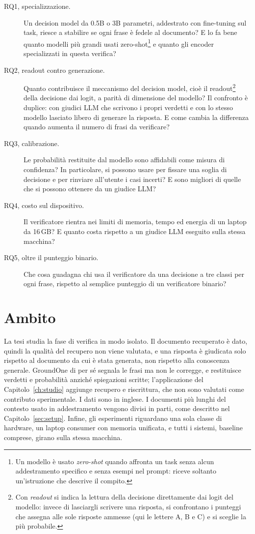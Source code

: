 \begin{description}
\item[RQ1, specializzazione.] Un decision model da 0.5B o 3B parametri, addestrato con fine-tuning sul task, riesce a
stabilire se ogni frase è fedele al documento? E lo fa bene quanto modelli più grandi usati zero-shot\footnote{Un modello è usato \emph{zero-shot} quando affronta un task senza alcun addestramento specifico
e senza esempi nel prompt: riceve soltanto un'istruzione che descrive il compito.}
e quanto gli encoder specializzati in questa verifica?
\item[RQ2, readout contro generazione.] Quanto contribuisce il meccanismo del decision model, cioè il readout\footnote{Con \emph{readout} si indica la lettura della decisione direttamente dai logit del modello:
invece di lasciargli scrivere una risposta, si confrontano i punteggi che assegna alle sole risposte ammesse (qui le
lettere A, B e C) e si sceglie la più probabile.}
della decisione dai logit, a parità di dimensione del modello? Il confronto è duplice: con giudici LLM che
scrivono i propri verdetti e con lo stesso modello lasciato libero di generare la risposta. E come cambia la differenza
quando aumenta il numero di frasi da verificare?
\item[RQ3, calibrazione.] Le probabilità restituite dal modello sono affidabili come misura di confidenza? In
particolare, si possono usare per fissare una soglia di decisione e per rinviare all'utente i casi incerti? E sono
migliori di quelle che si possono ottenere da un giudice LLM?
\item[RQ4, costo sul dispositivo.] Il verificatore rientra nei limiti di memoria, tempo ed energia di un laptop da
16\,GB? E quanto costa rispetto a un giudice LLM eseguito sulla stessa macchina?
\item[RQ5, oltre il punteggio binario.] Che cosa guadagna chi usa il verificatore da una decisione a tre classi per
ogni frase, rispetto al semplice punteggio di un verificatore binario?
\end{description}

\section{Ambito}
\label{sec:intro-scope}

La tesi studia la fase di verifica in modo isolato. Il documento recuperato è dato, quindi la qualità del recupero non
viene valutata, e una risposta è giudicata solo rispetto al documento da cui è stata generata, non rispetto alla
conoscenza generale. GroundOne di per sé segnala le frasi ma non le corregge, e restituisce verdetti e probabilità anziché spiegazioni scritte; l'applicazione del Capitolo~\ref{ch:studio} aggiunge recupero e riscrittura, che non sono valutati come contributo sperimentale. I dati sono in inglese. I documenti più lunghi del contesto usato in addestramento vengono divisi in
parti, come descritto nel Capitolo~\ref{sec:setup}. Infine, gli esperimenti riguardano una sola classe di hardware, un
laptop consumer con memoria unificata, e tutti i sistemi, baseline comprese, girano sulla stessa macchina.

